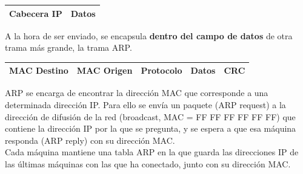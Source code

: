 \begin{table}[h] \centering \begin{tabular}{|c|c|}
\hline Cabecera IP & Datos \\ \hline \end{tabular}
\end{table}
A la hora de ser enviado, se encapsula \textbf{dentro del campo de datos} de otra trama más grande, la trama ARP.

\begin{table}[h] \centering \begin{tabular}{|l|c|c|l|l|}
\hline MAC Destino & MAC Origen & Protocolo & \textbf{Datos} & CRC \\ \hline \end{tabular}
\end{table}
\vspace{2cm}
ARP se encarga de encontrar la dirección MAC que corresponde a una determinada dirección IP. Para ello se envía un paquete (ARP request) a la dirección de difusión de la red (broadcast, MAC = FF FF FF FF FF FF) que contiene la dirección IP por la que se pregunta, y se espera a que esa máquina responda (ARP reply) con su dirección MAC.\\

Cada máquina mantiene una tabla ARP en la que guarda las direcciones IP de las últimas máquinas con las que ha conectado, junto con su dirección MAC.
\newpage
